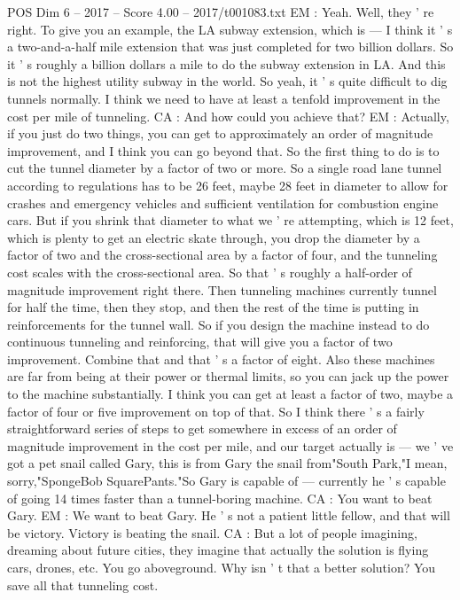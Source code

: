 \begin{textsample}{POS Dim 6 – 2017 – Score 4.00 – 2017/t001083.txt}
EM : Yeah.
Well, they ' re right.
To give you an example, the LA subway extension, which is — I think it ' s a two-and-a-half mile extension that was just completed for two billion dollars.
So it ' s roughly a billion dollars a mile to do the subway extension in LA.
And this is not the highest utility subway in the world.
So yeah, it ' s quite difficult to dig tunnels normally.
I think we need to have at least a tenfold improvement in the cost per mile of tunneling.
CA : And how could you achieve that?
EM : Actually, if you just do two things, you can get to approximately an order of magnitude improvement, and I think you can go beyond that.
So the first thing to do is to cut the tunnel diameter by a factor of two or more.
So a single road lane tunnel according to regulations has to be 26 feet, maybe 28 feet in diameter to allow for crashes and emergency vehicles and sufficient ventilation for combustion engine cars.
But if you shrink that diameter to what we ' re attempting, which is 12 feet, which is plenty to get an electric skate through, you drop the diameter by a factor of two and the cross-sectional area by a factor of four, and the tunneling cost scales with the cross-sectional area.
So that ' s roughly a half-order of magnitude improvement right there.
Then tunneling machines currently tunnel for half the time, then they stop, and then the rest of the time is putting in reinforcements for the tunnel wall.
So if you design the machine instead to do continuous tunneling and reinforcing, that will give you a factor of two improvement.
Combine that and that ' s a factor of eight.
Also these machines are far from being at their power or thermal limits, so you can jack up the power to the machine substantially.
I think you can get at least a factor of two, maybe a factor of four or five improvement on top of that.
So I think there ' s a fairly straightforward series of steps to get somewhere in excess of an order of magnitude improvement in the cost per mile, and our target actually is — we ' ve got a pet snail called Gary, this is from Gary the snail from"South Park,"I mean, sorry,"SpongeBob SquarePants."So Gary is capable of — currently he ' s capable of going 14 times faster than a tunnel-boring machine.
CA : You want to beat Gary.
EM : We want to beat Gary.
He ' s not a patient little fellow, and that will be victory.
Victory is beating the snail.
CA : But a lot of people imagining, dreaming about future cities, they imagine that actually the solution is flying cars, drones, etc.
You go aboveground.
Why isn ' t that a better solution?
You save all that tunneling cost.

\end{textsample}
